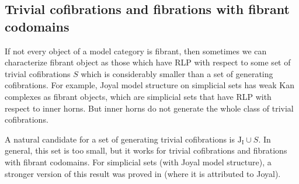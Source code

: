 \documentclass[reqno]{amsart}
\theoremstyle{definition}
\newcommand{\I}{\mathrm{I}}
\newcommand{\J}{\mathrm{J}}
\begin{document}
\subsection{Trivial cofibrations and fibrations with fibrant codomains}

If not every object of a model category is fibrant, then sometimes we can characterize fibrant object as those which have
RLP with respect to some set of trivial cofibrations $S$ which is considerably smaller than a set of generating cofibrations.
For example, Joyal model structure on simplicial sets has weak Kan complexes as fibrant objects,
which are simplicial sets that have RLP with respect to inner horns.
But inner horns do not generate the whole class of trivial cofibrations.

A natural candidate for a set of generating trivial cofibrations is $\J_\I \cup S$.
In general, this set is too small, but it works for trivial cofibrations and fibrations with fibrant codomains.
For simplicial sets (with Joyal model structure), a stronger version of this result was proved in \cite{lurie-topos} (where it is attributed to Joyal).
\end{document}
